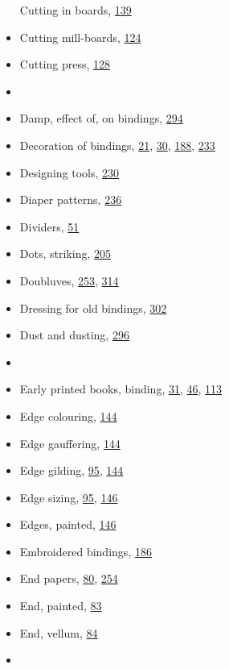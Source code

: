 \documentclass[
]{article}
\begin{document}
\begin{itemize}
  Cutting in boards, \protect\hyperlink{Page_139}{139}
\item
  Cutting mill-boards, \protect\hyperlink{Page_124}{124}
\item
  Cutting press, \protect\hyperlink{Page_128}{128}
\item
  ~
\item
  {Damp}, effect of, on bindings, \protect\hyperlink{Page_294}{294}
\item
  Decoration of bindings, \protect\hyperlink{Page_21}{21},
  \protect\hyperlink{Page_30}{30}, \protect\hyperlink{Page_188}{188},
  \protect\hyperlink{Page_233}{233}
\item
  Designing tools, \protect\hyperlink{Page_230}{230}
\item
  Diaper patterns, \protect\hyperlink{Page_236}{236}
\item
  Dividers, \protect\hyperlink{Page_51}{51}
\item
  Dots, striking, \protect\hyperlink{Page_205}{205}
\item
  Doubluves, \protect\hyperlink{Page_253}{253},
  \protect\hyperlink{Page_314}{314}
\item
  Dressing for old bindings, \protect\hyperlink{Page_302}{302}
\item
  Dust and dusting, \protect\hyperlink{Page_296}{296}
\item
  ~
\item
  {Early} printed books, binding, \protect\hyperlink{Page_31}{31},
  \protect\hyperlink{Page_46}{46}, \protect\hyperlink{Page_113}{113}
\item
  Edge colouring, \protect\hyperlink{Page_144}{144}
\item
  Edge gauffering, \protect\hyperlink{Page_144}{144}
\item
  Edge gilding, \protect\hyperlink{Page_95}{95},
  \protect\hyperlink{Page_144}{144}
\item
  Edge sizing, \protect\hyperlink{Page_95}{95},
  \protect\hyperlink{Page_146}{146}
\item
  Edges, painted, \protect\hyperlink{Page_146}{146}
\item
  Embroidered bindings, \protect\hyperlink{Page_186}{186}
\item
  End papers, \protect\hyperlink{Page_80}{80},
  \protect\hyperlink{Page_254}{254}
\item
  End, painted, \protect\hyperlink{Page_83}{83}
\item
  End, vellum, \protect\hyperlink{Page_84}{84}
\item

\end{itemize}
\end{document}
